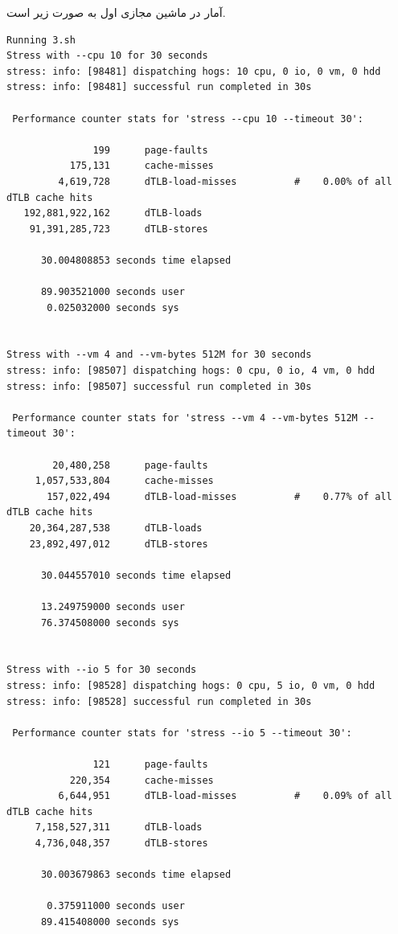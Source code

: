 \documentclass{article}
\begin{document}
آمار در ماشین مجازی اول به صورت زیر است.
\begin{latin}
\begin{lstlisting}
Running 3.sh
Stress with --cpu 10 for 30 seconds
stress: info: [98481] dispatching hogs: 10 cpu, 0 io, 0 vm, 0 hdd
stress: info: [98481] successful run completed in 30s

 Performance counter stats for 'stress --cpu 10 --timeout 30':

               199      page-faults                                                 
           175,131      cache-misses                                                
         4,619,728      dTLB-load-misses          #    0.00% of all dTLB cache hits 
   192,881,922,162      dTLB-loads                                                  
    91,391,285,723      dTLB-stores                                                 

      30.004808853 seconds time elapsed

      89.903521000 seconds user
       0.025032000 seconds sys


Stress with --vm 4 and --vm-bytes 512M for 30 seconds
stress: info: [98507] dispatching hogs: 0 cpu, 0 io, 4 vm, 0 hdd
stress: info: [98507] successful run completed in 30s

 Performance counter stats for 'stress --vm 4 --vm-bytes 512M --timeout 30':

        20,480,258      page-faults                                                 
     1,057,533,804      cache-misses                                                
       157,022,494      dTLB-load-misses          #    0.77% of all dTLB cache hits 
    20,364,287,538      dTLB-loads                                                  
    23,892,497,012      dTLB-stores                                                 

      30.044557010 seconds time elapsed

      13.249759000 seconds user
      76.374508000 seconds sys


Stress with --io 5 for 30 seconds
stress: info: [98528] dispatching hogs: 0 cpu, 5 io, 0 vm, 0 hdd
stress: info: [98528] successful run completed in 30s

 Performance counter stats for 'stress --io 5 --timeout 30':

               121      page-faults                                                 
           220,354      cache-misses                                                
         6,644,951      dTLB-load-misses          #    0.09% of all dTLB cache hits 
     7,158,527,311      dTLB-loads                                                  
     4,736,048,357      dTLB-stores                                                 

      30.003679863 seconds time elapsed

       0.375911000 seconds user
      89.415408000 seconds sys
\end{lstlisting}
\end{latin}
\end{document}
